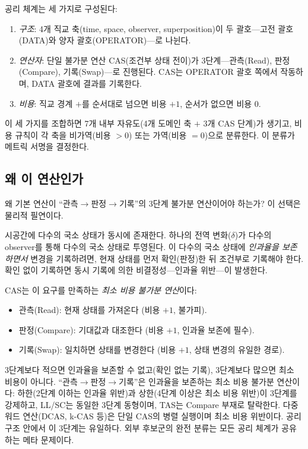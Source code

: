 \documentclass[entropy,article,submit,pdftex,oneauthor]{Definitions/mdpi}
\begin{document}
공리 체계는 세 가지로 구성된다:
\begin{enumerate}
\item \emph{구조}: 4개 직교 축(time, space, observer, superposition)이 두 괄호---고전 괄호(DATA)와 양자 괄호(OPERATOR)---로 나뉜다.
\item \emph{연산자}: 단일 불가분 연산 CAS(조건부 상태 전이)가 3단계---관측(Read), 판정(Compare), 기록(Swap)---로 진행된다. CAS는 OPERATOR 괄호 쪽에서 작동하며, DATA 괄호에 결과를 기록한다.
\item \emph{비용}: 직교 경계 $+$를 순서대로 넘으면 비용 $+1$, 순서가 없으면 비용 $0$.
\end{enumerate}

이 세 가지를 조합하면 7개 내부 자유도(4개 도메인 축 $+$ 3개 CAS 단계)가 생기고, 비용 규칙이 각 축을 비가역(비용 $> 0$) 또는 가역(비용 $= 0$)으로 분류한다. 이 분류가 메트릭 서명을 결정한다.

\subsection{왜 이 연산인가}

왜 기본 연산이 ``관측$\to$판정$\to$기록''의 3단계 불가분 연산이어야 하는가? 이 선택은 물리적 필연이다.

시공간에 다수의 국소 상태가 동시에 존재한다. 하나의 전역 변화($\delta$)가 다수의 observer를 통해 다수의 국소 상태로 투영된다. 이 다수의 국소 상태에 \emph{인과율을 보존하면서} 변경을 기록하려면, 현재 상태를 먼저 확인(판정)한 뒤 조건부로 기록해야 한다. 확인 없이 기록하면 동시 기록에 의한 비결정성---인과율 위반---이 발생한다.

CAS는 이 요구를 만족하는 \emph{최소 비용 불가분 연산}이다:
\begin{itemize}
\item 관측(Read): 현재 상태를 가져온다 (비용 $+1$, 불가피).
\item 판정(Compare): 기대값과 대조한다 (비용 $+1$, 인과율 보존에 필수).
\item 기록(Swap): 일치하면 상태를 변경한다 (비용 $+1$, 상태 변경의 유일한 경로).
\end{itemize}
3단계보다 적으면 인과율을 보존할 수 없고(확인 없는 기록), 3단계보다 많으면 최소 비용이 아니다. ``관측$\to$판정$\to$기록''은 인과율을 보존하는 최소 비용 불가분 연산이다: 하한(2단계 이하는 인과율 위반)과 상한(4단계 이상은 최소 비용 위반)이 3단계를 강제하고, LL/SC는 동일한 3단계 동형이며, TAS는 Compare 부재로 탈락한다. 다중 워드 연산(DCAS, k-CAS 등)은 단일 CAS의 병렬 실행이며 최소 비용 위반이다. 공리 구조 안에서 이 3단계는 유일하다. 외부 후보군의 완전 분류는 모든 공리 체계가 공유하는 메타 문제이다.
\end{document}
